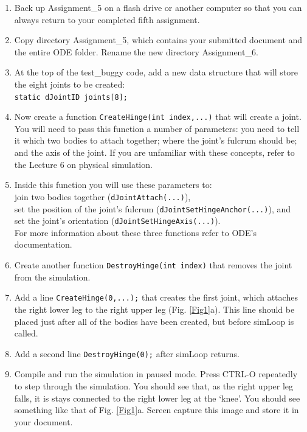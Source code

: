 \documentclass[12pt]{article}
\begin{document}
\begin{enumerate}

\item Back up Assignment\_5 on a flash drive or another computer so that you can always return to your completed fifth assignment.

\item Copy directory Assignment\_5, which contains your submitted document and the entire ODE folder. Rename the new directory Assignment\_6.

\item At the top of the test\_buggy code, add a new data structure that will store the eight joints to be created: \\
\texttt{static dJointID joints[8];}\\

\item Now create a function \texttt{CreateHinge(int index,...)} that will create a joint. You will need to pass this function a number of parameters: you need to tell it which two bodies to attach together; where the joint's fulcrum should be; and the axis of the joint. If you are unfamiliar with these concepts, refer to the Lecture 6 on physical simulation.

\item Inside this function you will use these parameters to: \\
join two bodies together (\texttt{dJointAttach(...)}), \\
set the position of the joint's fulcrum (\texttt{dJointSetHingeAnchor(...)}), and \\
set the joint's orientation (\texttt{dJointSetHingeAxis(...)}). \\
For more information about these three functions refer to ODE's documentation.

\item Create another function \texttt{DestroyHinge(int index)} that removes the joint from the simulation.

\item Add a line \texttt{CreateHinge(0,...);} that creates the first joint, which attaches the right lower leg to the right upper leg (Fig. \ref{Fig1}a). This line should be placed just after all of the bodies have been created, but before simLoop is called.

\item Add a second line \texttt{DestroyHinge(0);} after simLoop returns.

\item Compile and run the simulation in paused mode. Press CTRL-O repeatedly to step through the simulation. You should see that, as the right upper leg falls, it is stays connected to the right lower leg at the `knee'. You should see something like that of Fig. \ref{Fig1}a. Screen capture this image and store it in your document.


\end{enumerate}
\end{document}
